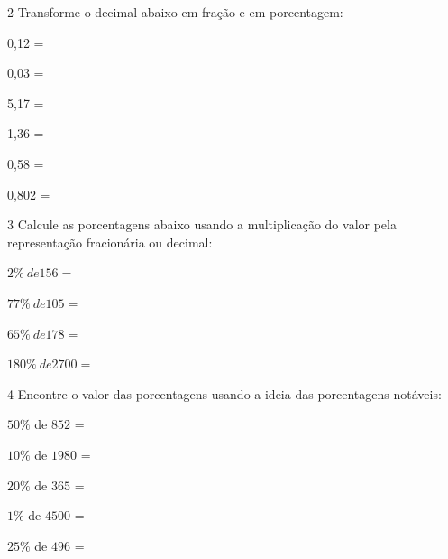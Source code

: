 \num{2} Transforme o decimal abaixo em fração e em porcentagem:

\begin{escolha}
  \item 0,12 =   \\
  \item 0,03 =    \\
  \item 5,17 =    \\
  \item 1,36 =    \\
  \item 0,58 =    \\
  \item 0,802 =  
\end{escolha}

\num{3} Calcule as porcentagens abaixo usando a multiplicação do valor pela
representação fracionária ou decimal:

\begin{escolha}
  \item $2\%\ de 156 =$  \\
  \item $77\%\ de 105 =$  \\
  \item $65\%\ de 178 =$  \\
  \item $180\%\ de 2700 =$  
\end{escolha}

\num{4} Encontre o valor das porcentagens usando a ideia das porcentagens
notáveis:

\begin{escolha}
  \item $50\%$ de $852$ =  \\
  \item $10\%$ de $1980$ =  \\
  \item $20\%$ de $365$ =  \\
  \item $1\%$ de $4500$ =  \\
  \item $25\%$ de $496$ =  
\end{escolha}

